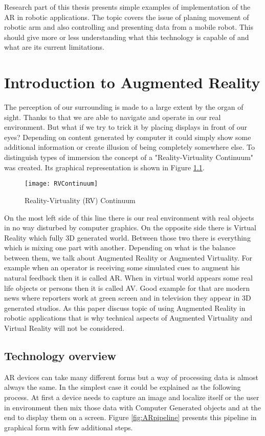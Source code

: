 \documentclass[printmode,en]{mgr}
\begin{document}
Research part of this thesis presents simple examples of implementation of the AR in robotic applications. The topic covers the issue of planing movement of robotic arm and also controlling and presenting data from a mobile robot. This should give more or less understanding what this technology is capable of and what are its current limitations.


\chapter{Introduction to Augmented Reality}
The perception of our surrounding is made to a large extent by the organ of sight. Thanks to that we are able to navigate and operate in our real environment. But what if we try to trick it by placing displays in front of our eyes? Depending on content generated by computer it could simply show some additional information or create illusion of being completely somewhere else. To distinguish types of immersion the concept of a "Reality-Virtuality Continuum" \cite{RVContinuum} was created. Its graphical representation is shown in Figure \ref{fig:RVContinuum}.

\begin{figure}[!ht]
  \centering
    \texttt{[image: RVContinuum]}
  \caption{Reality-Virtuality (RV) Continuum \cite{RVContinuum}}
  \label{fig:RVContinuum}
\end{figure}

On the most left side of this line there is our real environment with real objects in no way disturbed by computer graphics. On the opposite side there is Virtual Reality which fully 3D generated world. Between those two there is everything which is mixing one part with another. Depending on what is the balance between them, we talk about Augmented Reality or Augmented Virtuality. For example when an operator is receiving some simulated cues to augment his natural feedback then it is called AR. When in virtual world appears some real life objects or persons then it is called AV. Good example for that are modern news where reporters work at green screen and in television they appear in 3D generated studios. As this paper discuss topic of using Augmented Reality in robotic applications that is why technical aspects of Augmented Virtuality and Virtual Reality will not be considered.

\section{Technology overview}
AR devices can take many different forms but a way of processing data is almost always the same. In the simplest case it could be explained as the following process. At first a device needs to capture an image and localize itself or the user in environment then mix those data with Computer Generated objects and at the end to display them on a screen. Figure \ref{fig:ARpipeline} presents this pipeline in graphical form with few additional steps.
\end{document}
